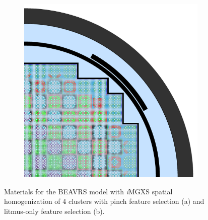 \begin{figure}[h!]
\begin{subfigure}{0.67\textwidth}
  \includegraphics[width=\linewidth]{figures/unsupervised/geometries/with-features/4-clusters/combined/full-core}
  \caption{}
  \label{fig:chap10-full-core-combined-4}
\end{subfigure}
\caption[Clustered geometries for BEAVRS]{Materials for the \ac{BEAVRS} model with \textit{i}\ac{MGXS} spatial homogenization of 4 clusters with pinch feature selection (a) and litmus-only feature selection (b).}
\label{fig:chap10-full-core-geometries-4}
\end{figure}

\clearpage

